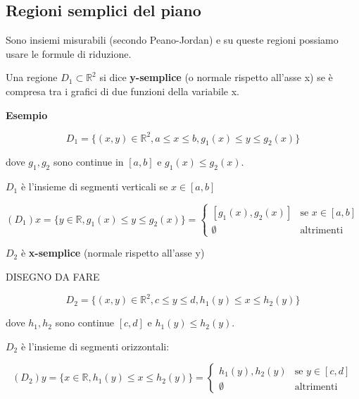 \documentclass[../appunti-analisi.tex]{subfiles}
\begin{document}
\newpage 

\subsection{Regioni semplici del piano}

Sono insiemi misurabili (secondo Peano-Jordan) e su queste regioni possiamo usare le formule di riduzione.

Una regione $D_1 \subset \mathbb{R}^{2}$ si dice \textbf{y-semplice} (o normale rispetto all'asse x) se è compresa tra i grafici di due funzioni della variabile x.

\textbf{Esempio} 

\begin{center}
\end{center}

\[
    D_1= \{(x,y) \in \mathbb{R}^{2}, a \le x \le b, g_1(x) \le y \le g_2(x)\}
\]

dove $g_1,g_2$ sono continue in $[a,b]$ e $g_1(x) \le g_2(x)$.

$D_1$ è l'insieme di segmenti verticali se $x \in [a,b]$

\[
    (D_1)x = \{y \in \mathbb{R}, g_1(x) \le y \le g_2(x)\} = \begin{cases}
        [g_1(x),g_2(x)] & \text{se $x \in [a,b]$} \\
        \emptyset & \text{altrimenti}
    \end{cases}
\]

$D_2$ è \textbf{x-semplice} (normale rispetto all'asse y)

DISEGNO DA FARE


\[
    D_2= \{(x,y) \in \mathbb{R}^{2}, c \le y \le d, h_1(y) \le x \le h_2(y)\}
\]
 
dove $h_1,h_2$ sono continue $[c,d]$ e $h_1(y) \le h_2(y)$.

$D_2$ è l'insieme di segmenti orizzontali:

\[
    (D_2) y = \{x \in \mathbb{R}, h_1(y) \le x \le h_2(y)\} = \begin{cases}
        h_1(y),h_2(y) & \text{se $y \in [c,d]$} \\
        \emptyset & \text{altrimenti}
    \end{cases}
\]
\end{document}
